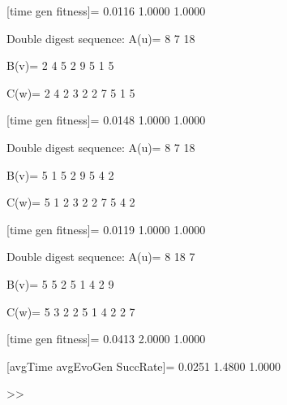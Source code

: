 [time gen fitness]=
    0.0116    1.0000    1.0000

Double digest sequence:
A(u)=
     8     7    18

B(v)=
     2     4     5     2     9     5     1     5

C(w)=
     2     4     2     3     2     2     7     5     1     5

[time gen fitness]=
    0.0148    1.0000    1.0000

Double digest sequence:
A(u)=
     8     7    18

B(v)=
     5     1     5     2     9     5     4     2

C(w)=
     5     1     2     3     2     2     7     5     4     2

[time gen fitness]=
    0.0119    1.0000    1.0000

Double digest sequence:
A(u)=
     8    18     7

B(v)=
     5     5     2     5     1     4     2     9

C(w)=
     5     3     2     2     5     1     4     2     2     7

[time gen fitness]=
    0.0413    2.0000    1.0000

[avgTime  avgEvoGen  SuccRate]=
    0.0251    1.4800    1.0000

>> 